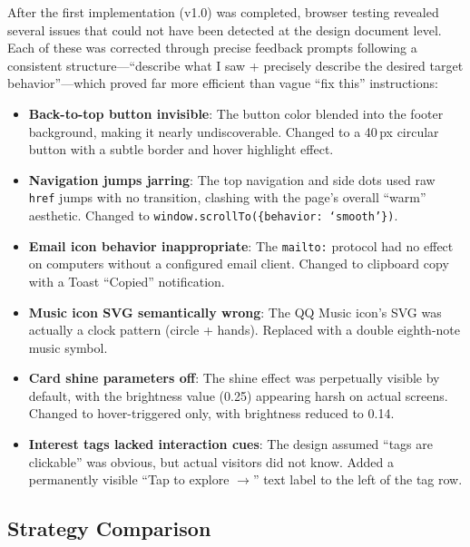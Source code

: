 After the first implementation (v1.0) was completed, browser testing revealed several issues that could not have been detected at the design document level. Each of these was corrected through precise feedback prompts following a consistent structure---``describe what I saw + precisely describe the desired target behavior''---which proved far more efficient than vague ``fix this'' instructions:

\begin{itemize}
    \item \textbf{Back-to-top button invisible}: The button color blended into the footer background, making it nearly undiscoverable. Changed to a 40\,px circular button with a subtle border and hover highlight effect.
    \item \textbf{Navigation jumps jarring}: The top navigation and side dots used raw \texttt{href} jumps with no transition, clashing with the page's overall ``warm'' aesthetic. Changed to \texttt{window.scrollTo(\{behavior: `smooth'\})}.
    \item \textbf{Email icon behavior inappropriate}: The \texttt{mailto:} protocol had no effect on computers without a configured email client. Changed to clipboard copy with a Toast ``Copied'' notification.
    \item \textbf{Music icon SVG semantically wrong}: The QQ Music icon's SVG was actually a clock pattern (circle + hands). Replaced with a double eighth-note music symbol.
    \item \textbf{Card shine parameters off}: The shine effect was perpetually visible by default, with the brightness value (0.25) appearing harsh on actual screens. Changed to hover-triggered only, with brightness reduced to 0.14.
    \item \textbf{Interest tags lacked interaction cues}: The design assumed ``tags are clickable'' was obvious, but actual visitors did not know. Added a permanently visible ``Tap to explore $\rightarrow$'' text label to the left of the tag row.
\end{itemize}

\subsection{Strategy Comparison}

